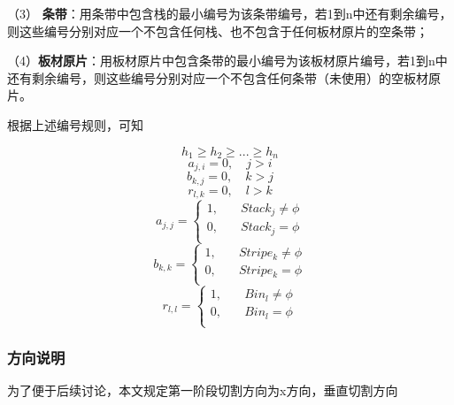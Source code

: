 \documentclass[bwprint]{gmcmthesis}
\begin{document}
（3） \textbf{条带}：用条带中包含栈的最小编号为该条带编号，若1到n中还有剩余编号，则这些编号分别对应一个不包含任何栈、也不包含于任何板材原片的空条带；

（4）\textbf{板材原片}：用板材原片中包含条带的最小编号为该板材原片编号，若1到n中还有剩余编号，则这些编号分别对应一个不包含任何条带（未使用）的空板材原片。

根据上述编号规则，可知

\begin{equation}
    h_{1} \ge h_{2} \ge ... \ge h_{n}
\end{equation} 
\begin{equation}
    a_{j,i}=0, \quad   j>i
\end{equation}
\begin{equation}
    b_{k,j}=0, \quad   k>j
\end{equation}
\begin{equation}
    r_{l,k}=0, \quad   l>k
\end{equation}
\begin{equation}
    a_{j,j}=
    \begin{cases}
        1, \quad  & Stack_j \neq  \phi  \\
        0,\quad  & Stack_j  =  \phi  \\
    \end{cases}
\end{equation}
\begin{equation}
    b_{k,k}=
    \begin{cases}
        1, \quad  & Stripe_k \neq  \phi  \\
        0,\quad  & Stripe_k =  \phi  \\
    \end{cases}
\end{equation}
\begin{equation}
    r_{l,l}=
    \begin{cases}
        1, \quad  & Bin_l \neq  \phi  \\
        0,\quad  & Bin_l = \phi  \\
    \end{cases}
\end{equation}


\subsubsection{方向说明}
为了便于后续讨论，本文规定第一阶段切割方向为x方向，垂直切割方向
\end{document}
